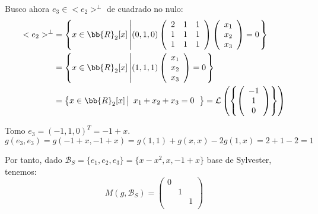 \begin{ejercicio}
\begin{enumerate}
        Busco ahora $e_3 \in <e_2>^\perp$ de cuadrado no nulo:
        \begin{equation*}\begin{split}
            <e_2>^\perp & = \left\{x\in \bb{R}_2[x] \left|
            (0, 1, 0)\left( \begin{array}{ccc}
                2 & 1 & 1 \\
                1 & 1 & 1 \\
                1 & 1 & 1 \\
            \end{array}\right)
            \left( \begin{array}{c}
                x_1 \\ x_2 \\ x_3
            \end{array}\right)
            = 0
            \right.\right\}\\
            & = \left\{x\in \bb{R}_2[x] \left|
            (1, 1, 1)
            \left( \begin{array}{c}
                x_1 \\ x_2 \\ x_3
            \end{array}\right)
            = 0
            \right.\right\} \\
            &= \left\{x\in \bb{R}_2[x] \left|
            \begin{array}{c}
                x_1 + x_2 + x_3 = 0
            \end{array}
            \right.\right\} = \mathcal{L} \left( \left\{ \left(
            \begin{array}{c}
                -1 \\ 1 \\ 0
            \end{array}
            \right) \right\}\right)
        \end{split}\end{equation*}

        Tomo $e_3 = (-1,1,0)^T = -1 + x$.
        \begin{equation*}
            g(e_3, e_3) = g(-1+x, -1+x) = g(1,1) + g(x,x) -2g(1,x) = 2+1-2 = 1
        \end{equation*}

        Por tanto, dado $\mathcal{B}_S = \{e_1, e_2, e_3\} = \{x-x^2, x, -1+x\}$ base de Sylvester, tenemos:
        \begin{equation*}
            M(g, \mathcal{B}_S) = \left( \begin{array}{ccc}
                0 &  &  \\
                 & 1 &  \\
                 &  & 1 \\
            \end{array}\right)
        \end{equation*}


\end{enumerate}
\end{ejercicio}
